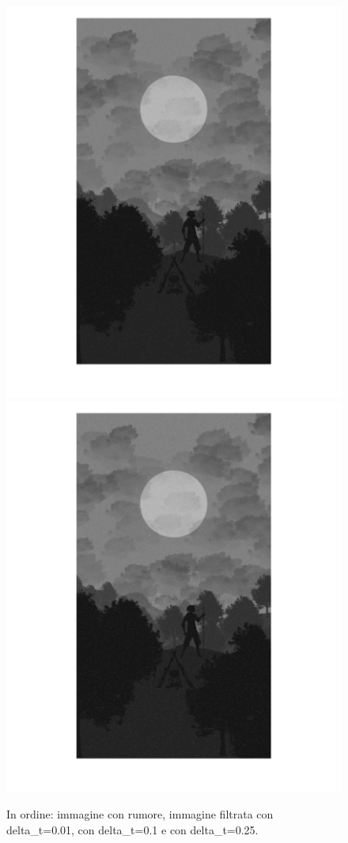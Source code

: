 \begin{figure}[htb]
\includegraphics[scale=0.15]{Pictures/Esempi di utilizzo/Esempio 3/SfondoForesta_filtrata_deltat0_1.png}
\includegraphics[scale=0.15]{Pictures/Esempi di utilizzo/Esempio 3/SfondoForesta_filtrata_deltat0_25.png}
\caption{In ordine: immagine con rumore, immagine filtrata con delta\_t=0.01, con delta\_t=0.1 e con delta\_t=0.25.}\label{fig:figura}
\end{figure} 
